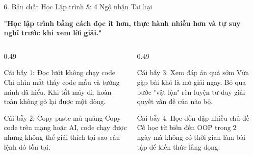 \documentclass[aspectratio=169, 10pt]{beamer}
\begin{document}
\begin{frame}{6. Bản chất Học Lập trình \& 4 Ngộ nhận Tai hại}
  \begin{tcolorbox}[colback=accentorange!12, colframe=accentorange, arc=3pt, left=6pt, right=6pt, top=2.5pt, bottom=2.5pt]
    \centering\footnotesize\bfseries
    "Học lập trình bằng cách đọc ít hơn, thực hành nhiều hơn và tự suy nghĩ trước khi xem lời giải."
  \end{tcolorbox}
  \vspace{0.06cm}
  \begin{columns}[T]
    \begin{column}{0.49\textwidth}
      \begin{cbox}[accentorange]{Cái bẫy 1: Đọc lướt không chạy code}
        \scriptsize
        Chỉ nhìn mắt thấy code mẫu và tưởng mình đã hiểu. Khi tắt máy đi, hoàn toàn không gõ lại được một dòng.
      \end{cbox}
      \vspace{0.06cm}
      \begin{cbox}[accentorange]{Cái bẫy 2: Copy-paste mù quáng}
        \scriptsize
        Copy code trên mạng hoặc AI, code chạy được nhưng không thể giải thích tại sao câu lệnh đó tồn tại.
      \end{cbox}
    \end{column}
    \begin{column}{0.49\textwidth}
      \begin{cbox}[accentorange]{Cái bẫy 3: Xem đáp án quá sớm}
        \scriptsize
        Vừa gặp bài khó là mở giải ngay. Bỏ qua bước "vật lộn" rèn luyện tư duy giải quyết vấn đề của não bộ.
      \end{cbox}
      \vspace{0.06cm}
      \begin{cbox}[accentorange]{Cái bẫy 4: Học dồn dập nhiều chủ đề}
        \scriptsize
        Cố học từ biến đến OOP trong 2 ngày mà không có thời gian làm bài tập để kiến thức lắng đọng.
      \end{cbox}
    \end{column}
  \end{columns}
\end{frame}
\end{document}
